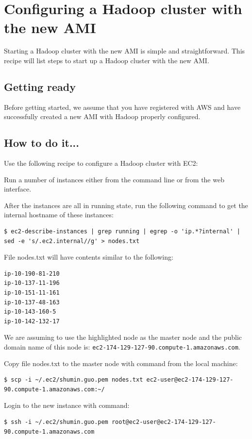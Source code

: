 \section{Configuring a Hadoop cluster with the new AMI}
Starting a Hadoop cluster with the new AMI is simple and straightforward. This recipe will list steps to start up a Hadoop cluster with the new AMI.
\subsection*{Getting ready}
Before getting started, we assume that you have registered with AWS and have successfully created a new AMI with Hadoop properly configured.
\subsection*{How to do it...}
Use the following recipe to configure a Hadoop cluster with EC2:

Run a number of instances either from the command line or from the web interface.

After the instances are all in running state, run the following command to get the internal hostname of these instances:
\lstset{style=bashstyle}
\begin{lstlisting}
$ ec2-describe-instances | grep running | egrep -o 'ip.*?internal' | sed -e 's/.ec2.internal//g' > nodes.txt
\end{lstlisting}

File nodes.txt will have contents similar to the following:
\lstset{style=bashstyle}
\begin{lstlisting}
ip-10-190-81-210
ip-10-137-11-196
ip-10-151-11-161
ip-10-137-48-163
ip-10-143-160-5
ip-10-142-132-17
\end{lstlisting}

We are assuming to use the highlighted node as the master node and the public domain name of this node is: \verb|ec2-174-129-127-90.compute-1.amazonaws.com|.


Copy file nodes.txt to the master node with command from the local machine:
\lstset{style=bashstyle}
\begin{lstlisting}
$ scp -i ~/.ec2/shumin.guo.pem nodes.txt ec2-user@ec2-174-129-127-90.compute-1.amazonaws.com:~/
\end{lstlisting}


Login to the new instance with command:
\lstset{style=bashstyle}
\begin{lstlisting}
$ ssh -i ~/.ec2/shumin.guo.pem root@ec2-user@ec2-174-129-127-90.compute-1.amazonaws.com
\end{lstlisting}

